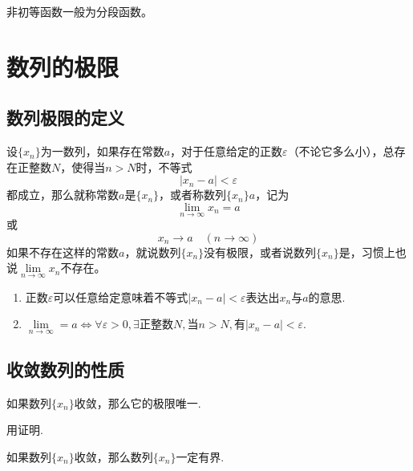 \documentclass[lang=cn,10pt]{elegantbook}
\begin{document}
\begin{remark}
	非初等函数一般为分段函数。
\end{remark}

\section{数列的极限}
\subsection{数列极限的定义}

\begin{definition}[数列极限]
	设\( \{x_{n}\} \)为一数列，如果存在常数\( a \)，对于任意给定的正数\( \varepsilon \)（不论它多么小），总存在正整数\( N \)，使得当\( n > N \)时，不等式
	\[ | x_{n} - a | < \varepsilon \]
	都成立，那么就称常数\( a \)是\( \{x_{n}\} \)，或者称数列\( \{x_{n}\} \)\( a \)，记为
	\[ \lim_{n \to \infty}x_{n} = a \]
	或
	\[ x_{n} \rightarrow a\quad( n \to \infty) \]
	如果不存在这样的常数\( a \)，就说数列\( \{x_{n}\} \)没有极限，或者说数列\( \{x_{n}\} \)是，习惯上也说\( \lim\limits_{n \to \infty}x_{n} \)不存在。
\end{definition}

\begin{note}
	\begin{enumerate}
		\item 正数\( \varepsilon \)可以任意给定意味着不等式\( | x_{n} - a | < \varepsilon \)表达出\( x_{n} \)与\( a \)的意思.
		\item \( \lim\limits_{n \to \infty} = a \Leftrightarrow \forall \varepsilon > 0 , \exists \textbf{正整数}N,\textbf{当}n>N,有|x_{n} - a| < \varepsilon \).
	\end{enumerate}
\end{note}

\subsection{收敛数列的性质}
\begin{theorem}[极限的唯一性]
	如果数列\( \{x_{n}\} \)收敛，那么它的极限唯一.
\end{theorem}

\begin{remark}
	用证明.
\end{remark}

\begin{theorem}[收敛数列的有界性]
	如果数列\( \{x_{n}\} \)收敛，那么数列\( \{x_{n}\} \)一定有界.
\end{theorem}
\end{document}
